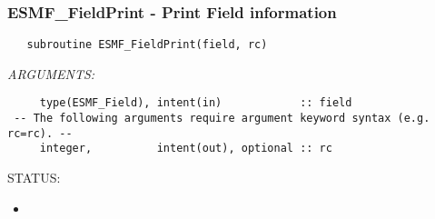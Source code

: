 
\setlength{\oldparskip}{\parskip}
\setlength{\parskip}{1.5ex}
\setlength{\oldparindent}{\parindent}
\setlength{\parindent}{0pt}
\setlength{\oldbaselineskip}{\baselineskip}
\setlength{\baselineskip}{11pt}
 
\def\bv{\begin{verbatim}}
\def\ev{\end{verbatim}}
\def\be{\begin{equation}}
\def\ee{\end{equation}}
\def\bea{\begin{eqnarray}}
\def\eea{\end{eqnarray}}
\def\bi{\begin{itemize}}
\def\ei{\end{itemize}}
\def\bn{\begin{enumerate}}
\def\en{\end{enumerate}}
\def\bd{\begin{description}}
\def\ed{\end{description}}
\def\({\left (}
\def\){\right )}
\def\[{\left [}
\def\]{\right ]}
\def\<{\left  \langle}
\def\>{\right \rangle}
\def\cI{{\cal I}}
\def\diag{\mathop{\rm diag}}
\def\tr{\mathop{\rm tr}}


 
\subsubsection [ESMF\_FieldPrint] {ESMF\_FieldPrint - Print Field information}


 
\begin{verbatim}   subroutine ESMF_FieldPrint(field, rc)\end{verbatim}{\em ARGUMENTS:}
\begin{verbatim}     type(ESMF_Field), intent(in)            :: field
 -- The following arguments require argument keyword syntax (e.g. rc=rc). --
     integer,          intent(out), optional :: rc\end{verbatim}
{\sf STATUS:}
   \begin{itemize}
   \item{}
   \end{itemize}
  
